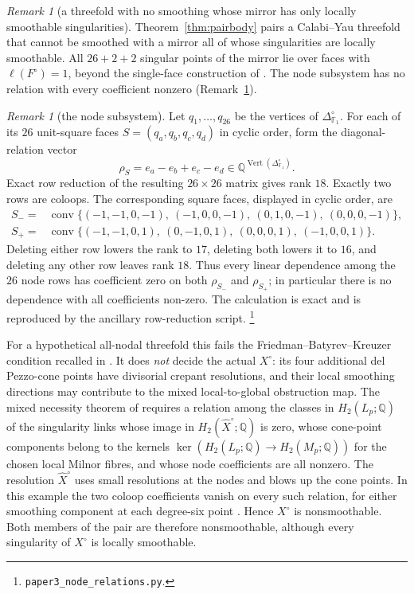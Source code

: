 \documentclass[11pt]{amsart}
\theoremstyle{definition}
\theoremstyle{remark}
\newtheorem{remark}[theorem]{Remark}
\newcommand{\FF}{\mathbb{F}}
\newcommand{\conv}{\operatorname{conv}}
\begin{document}
\begin{remark}[a threefold with no smoothing whose mirror has only
locally smoothable singularities]\label{rem:frozen}
Theorem~\ref{thm:pairbody} pairs a Calabi--Yau threefold that cannot
be smoothed with a mirror all of whose singularities are locally
smoothable.  All $26+2+2$ singular points of the mirror lie over faces
with $\ell(F^\circ)=1$, beyond the single-face construction of
\cite{paper2}.  The node subsystem has no relation with every
coefficient nonzero (Remark~\ref{rem:node-subsystem}).
\end{remark}

\begin{remark}[the node subsystem]\label{rem:node-subsystem}\label{q:mirror-smooth}
Let $q_1,\dots,q_{26}$ be the vertices of
$\Delta_{\FF_1}^\circ$.  For each of its $26$ unit-square faces
$S=(q_a,q_b,q_c,q_d)$ in cyclic order, form the diagonal-relation vector
\[
 \rho_S=e_a-e_b+e_c-e_d\in
 \mathbb{Q}^{\operatorname{Vert}(\Delta_{\FF_1}^\circ)}.
\]
Exact row reduction of the resulting $26\times26$ matrix gives rank $18$.
Exactly two rows are coloops.  The corresponding square faces, displayed
in cyclic order, are
\[
\begin{aligned}
S_-={}&\conv\{(-1,-1,0,-1),\ (-1,0,0,-1),\
                 (0,1,0,-1),\ (0,0,0,-1)\},\\
S_+={}&\conv\{(-1,-1,0,1),\ (0,-1,0,1),\
                 (0,0,0,1),\ (-1,0,0,1)\}.
\end{aligned}
\]
Deleting either row lowers the rank to $17$, deleting both lowers it to
$16$, and deleting any other row leaves rank $18$.
Thus every linear dependence among the $26$ node rows has coefficient zero
on both $\rho_{S_-}$ and $\rho_{S_+}$; in particular there is no dependence
with all coefficients non-zero.  The calculation is exact and is reproduced
by the ancillary row-reduction script.
\footnote{\texttt{paper3\_node\_relations.py}.}

For a hypothetical all-nodal threefold this fails the
Friedman--Batyrev--Kreuzer condition recalled in \cite[\S7]{paper2}.
It does \emph{not} decide the actual $X^\circ$: its four additional
del Pezzo-cone points have divisorial crepant resolutions, and their local
smoothing directions may contribute to the mixed local-to-global
obstruction map.  The mixed necessity theorem of \cite[Theorem~6.1]{paper4} requires a
relation among the classes in $H_2(L_p;\mathbb Q)$ of the singularity
links whose image in $H_2(\widehat X^\circ;\mathbb Q)$ is zero, whose
cone-point components belong to the kernels
$\ker(H_2(L_p;\mathbb Q)\to H_2(M_p;\mathbb Q))$ for the chosen local
Milnor fibres, and whose node coefficients are all nonzero.  The
resolution $\widehat X^\circ$ uses small resolutions at the nodes and
blows up the cone points.  In this example the two coloop coefficients
vanish on every such relation, for either smoothing component at each
degree-six point \cite[\S5.3, Theorem~6.5]{paper4}.
Hence $X^\circ$ is nonsmoothable.  Both members of the pair
are therefore nonsmoothable, although every singularity of $X^\circ$
is locally smoothable.
\end{remark}
\end{document}
